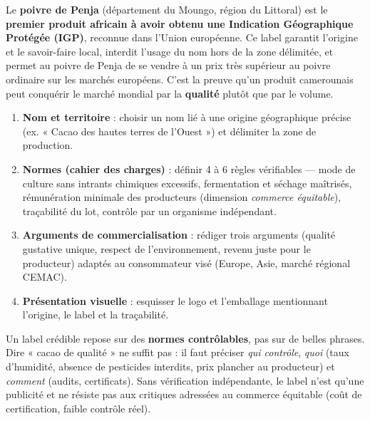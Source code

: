 \documentclass[11pt]{article}
\begin{document}
\begin{exemplebox}
Le \textbf{poivre de Penja} (département du Moungo, région du Littoral) est le \textbf{premier produit africain à avoir obtenu une Indication Géographique Protégée (IGP)}, reconnue dans l'Union européenne. Ce label garantit l'origine et le savoir-faire local, interdit l'usage du nom hors de la zone délimitée, et permet au poivre de Penja de se vendre à un prix très supérieur au poivre ordinaire sur les marchés européens. C'est la preuve qu'un produit camerounais peut conquérir le marché mondial par la \textbf{qualité} plutôt que par le volume.
\end{exemplebox}

\begin{methode}
\begin{enumerate}
\item \textbf{Nom et territoire} : choisir un nom lié à une origine géographique précise (ex. « Cacao des hautes terres de l'Ouest ») et délimiter la zone de production.
\item \textbf{Normes (cahier des charges)} : définir 4 à 6 règles vérifiables — mode de culture sans intrants chimiques excessifs, fermentation et séchage maîtrisés, rémunération minimale des producteurs (dimension \emph{commerce équitable}), traçabilité du lot, contrôle par un organisme indépendant.
\item \textbf{Arguments de commercialisation} : rédiger trois arguments (qualité gustative unique, respect de l'environnement, revenu juste pour le producteur) adaptés au consommateur visé (Europe, Asie, marché régional CEMAC).
\item \textbf{Présentation visuelle} : esquisser le logo et l'emballage mentionnant l'origine, le label et la traçabilité.
\end{enumerate}
\end{methode}

\begin{attention}
Un label crédible repose sur des \textbf{normes contrôlables}, pas sur de belles phrases. Dire « cacao de qualité » ne suffit pas : il faut préciser \emph{qui contrôle}, \emph{quoi} (taux d'humidité, absence de pesticides interdits, prix plancher au producteur) et \emph{comment} (audits, certificats). Sans vérification indépendante, le label n'est qu'une publicité et ne résiste pas aux critiques adressées au commerce équitable (coût de certification, faible contrôle réel).
\end{attention}
\end{document}
